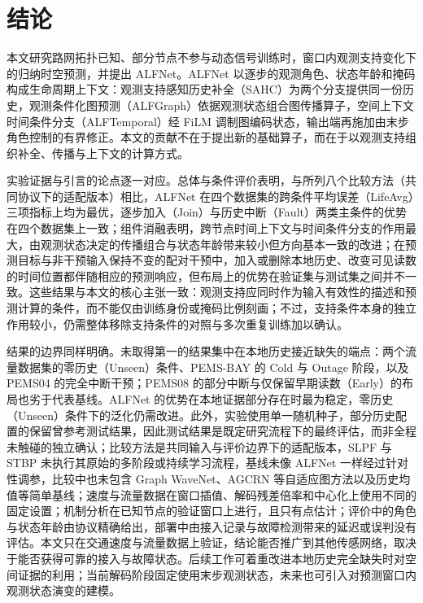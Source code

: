 \section{结论}\label{sec:conclusion}
本文研究路网拓扑已知、部分节点不参与动态信号训练时，窗口内观测支持变化下的归纳时空预测，并提出 ALFNet。ALFNet 以逐步的观测角色、状态年龄和掩码构成生命周期上下文：观测支持感知历史补全（SAHC）为两个分支提供同一份历史，观测条件化图预测（ALFGraph）依据观测状态组合图传播算子，空间上下文时间条件分支（ALFTemporal）经 FiLM 调制图编码状态，输出端再施加由末步角色控制的有界修正。本文的贡献不在于提出新的基础算子，而在于以观测支持组织补全、传播与上下文的计算方式。

实验证据与引言的论点逐一对应。总体与条件评价表明，与所列八个比较方法（共同协议下的适配版本）相比，ALFNet 在四个数据集的跨条件平均误差（LifeAvg）三项指标上均为最优，逐步加入（Join）与历史中断（Fault）两类主条件的优势在四个数据集上一致；组件消融表明，跨节点时间上下文与时间条件分支的作用最大，由观测状态决定的传播组合与状态年龄带来较小但方向基本一致的改进；在预测目标与非干预输入保持不变的配对干预中，加入或删除本地历史、改变可见读数的时间位置都伴随相应的预测响应，但布局上的优势在验证集与测试集之间并不一致。这些结果与本文的核心主张一致：观测支持应同时作为输入有效性的描述和预测计算的条件，而不能仅由训练身份或掩码比例刻画；不过，支持条件本身的独立作用较小，仍需整体移除支持条件的对照与多次重复训练加以确认。

结果的边界同样明确。未取得第一的结果集中在本地历史接近缺失的端点：两个流量数据集的零历史（Unseen）条件、PEMS-BAY 的 Cold 与 Outage 阶段，以及 PEMS04 的完全中断干预；PEMS08 的部分中断与仅保留早期读数（Early）的布局也劣于代表基线。ALFNet 的优势在本地证据部分存在时最为稳定，零历史（Unseen）条件下的泛化仍需改进。此外，实验使用单一随机种子，部分历史配置的保留曾参考测试结果，因此测试结果是既定研究流程下的最终评估，而非全程未触碰的独立确认；比较方法是共同输入与评价边界下的适配版本，SLPF 与 STBP 未执行其原始的多阶段或持续学习流程，基线未像 ALFNet 一样经过针对性调参，比较中也未包含 Graph WaveNet、AGCRN 等自适应图方法以及历史均值等简单基线；速度与流量数据在窗口插值、解码残差倍率和中心化上使用不同的固定设置；机制分析在已知节点的验证窗口上进行，且只有点估计；评价中的角色与状态年龄由协议精确给出，部署中由接入记录与故障检测带来的延迟或误判没有评估。本文只在交通速度与流量数据上验证，结论能否推广到其他传感网络，取决于能否获得可靠的接入与故障状态。后续工作可着重改进本地历史完全缺失时对空间证据的利用；当前解码阶段固定使用末步观测状态，未来也可引入对预测窗口内观测状态演变的建模。
